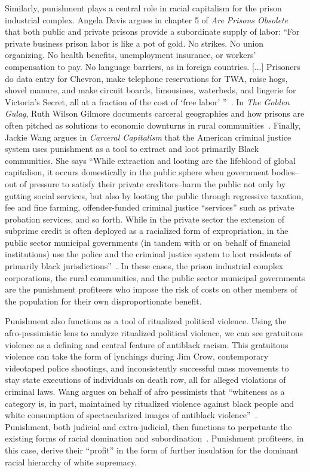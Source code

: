 \documentclass{article}
\begin{document}
        Similarly, punishment plays a central role in racial capitalism for the prison industrial complex. Angela Davis argues in chapter 5 of \textit{Are Prisons Obsolete} that both public and private prisons provide a subordinate supply of labor: ``For private business prison labor is like a pot of gold. No strikes. No union organizing. No health benefits, unemployment insurance, or workers’ compensation to pay. No language barriers, as in foreign countries. [...] Prisoners do data entry for Chevron, make telephone reservations for TWA, raise hogs, shovel manure, and make circuit boards, limousines, waterbeds, and lingerie for Victoria’s Secret, all at a fraction of the cost of `free labor' ''~\cite{are-prisons-obsolete}. In \textit{The Golden Gulag}, Ruth Wilson Gilmore documents carceral geographies and how prisons are often pitched as solutions to economic downturns in rural communities~\cite{golden-gulag}. Finally, Jackie Wang argues in \textit{Carceral Capitalism} that the American criminal justice system uses punishment as a tool to extract and loot primarily Black communities. She says ``While extraction and looting are the lifeblood of global capitalism, it occurs domestically in the public sphere when government bodies--out of pressure to satisfy their private creditors--harm the public not only by gutting social services, but also by looting the public through regressive taxation, fee and fine farming, offender-funded criminal justice ``services'' such as private probation services, and so forth. While in the private sector the extension of subprime credit is often deployed as a racialized form of expropriation, in the public sector municipal governments (in tandem with or on behalf of financial institutions) use the police and the criminal justice system to loot residents of primarily black jurisdictions''~\cite[p.76]{carceral-capitalism}. In these cases, the prison industrial complex corporations, the rural communities, and the public sector municipal governments are the punishment profiteers who impose the risk of costs on other members of the population for their own disproportionate benefit. 

        Punishment also functions as a tool of ritualized political violence. Using the afro-pessimistic lens to analyze ritualized political violence, we can see gratuitous violence as a defining and central feature of antiblack racism. This gratuitous violence can take the form of lynchings during Jim Crow, contemporary videotaped police shootings, and inconsistently successful mass movements to stay state executions of individuals on death row, all for alleged violations of criminal laws. Wang argues on behalf of afro pessimists that ``whiteness as a category is, in part, maintained by ritualized violence against black people and white consumption of spectacularized images of antiblack violence''~\cite[p.92]{carceral-capitalism}. Punishment, both judicial and extra-judicial, then functions to perpetuate the existing forms of racial domination and subordination~\cite{crt}. Punishment profiteers, in this case, derive their ``profit'' in the form of further insulation for the dominant racial hierarchy of white supremacy. 
\end{document}
